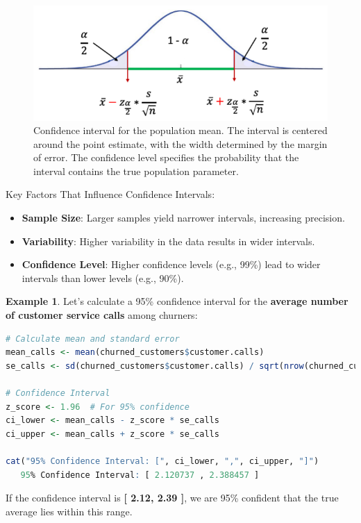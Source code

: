 \documentclass[
]{book}
\providecommand{\tightlist}{%
  \setlength{\itemsep}{0pt}\setlength{\parskip}{0pt}}
\theoremstyle{definition}
\theoremstyle{definition}
\newtheorem{example}{Example}[chapter]
\theoremstyle{definition}
\theoremstyle{definition}
\theoremstyle{remark}
\begin{document}
\begin{figure}

{\centering \includegraphics[width=0.8\linewidth]{images/confidence_interval} 

}

\caption{Confidence interval for the population mean. The interval is centered around the point estimate, with the width determined by the margin of error. The confidence level specifies the probability that the interval contains the true population parameter.}\label{fig:confidence-interval}
\end{figure}

Key Factors That Influence Confidence Intervals:

\begin{itemize}
\tightlist
\item
  \textbf{Sample Size}: Larger samples yield narrower intervals, increasing precision.\\
\item
  \textbf{Variability}: Higher variability in the data results in wider intervals.\\
\item
  \textbf{Confidence Level}: Higher confidence levels (e.g., 99\%) lead to wider intervals than lower levels (e.g., 90\%).
\end{itemize}

\begin{example}
\protect\hypertarget{exm:ex-confidence-service-call}{}\label{exm:ex-confidence-service-call}Let's calculate a 95\% confidence interval for the \textbf{average number of customer service calls} among churners:

\begin{lstlisting}[language=R]
# Calculate mean and standard error
mean_calls <- mean(churned_customers$customer.calls)
se_calls <- sd(churned_customers$customer.calls) / sqrt(nrow(churned_customers))

# Confidence Interval
z_score <- 1.96  # For 95% confidence
ci_lower <- mean_calls - z_score * se_calls
ci_upper <- mean_calls + z_score * se_calls

cat("95% Confidence Interval: [", ci_lower, ",", ci_upper, "]")
   95% Confidence Interval: [ 2.120737 , 2.388457 ]
\end{lstlisting}

If the confidence interval is \textbf{{[} 2.12, 2.39 {]}}, we are 95\% confident that the true average lies within this range.
\end{example}
\end{document}
